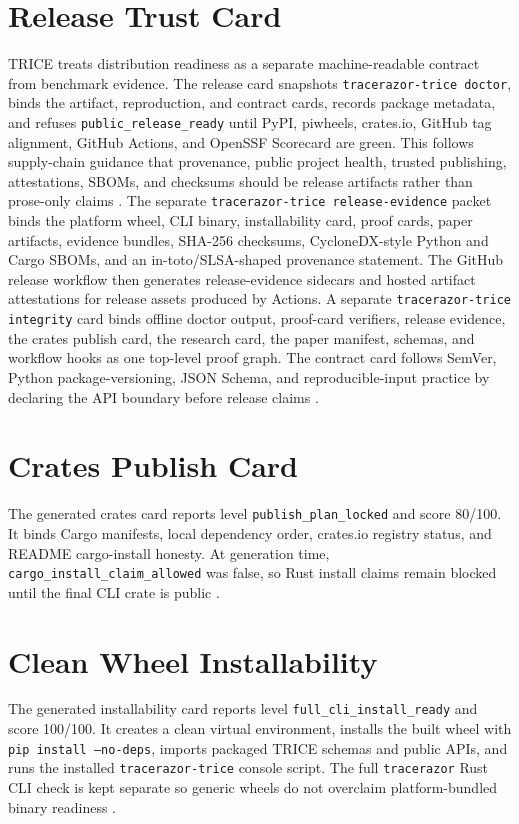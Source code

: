 \documentclass[10pt]{article}
\begin{document}
        \section{Release Trust Card}
TRICE treats distribution readiness as a separate machine-readable contract from benchmark evidence. The release card snapshots \texttt{tracerazor-trice doctor}, binds the artifact, reproduction, and contract cards, records package metadata, and refuses \texttt{public\_release\_ready} until PyPI, piwheels, crates.io, GitHub tag alignment, GitHub Actions, and OpenSSF Scorecard are green. This follows supply-chain guidance that provenance, public project health, trusted publishing, attestations, SBOMs, and checksums should be release artifacts rather than prose-only claims \cite{slsa,openssfscorecard,pypitrust,pypiattest,intoto,cyclonedx}. The separate \texttt{tracerazor-trice release-evidence} packet binds the platform wheel, CLI binary, installability card, proof cards, paper artifacts, evidence bundles, SHA-256 checksums, CycloneDX-style Python and Cargo SBOMs, and an in-toto/SLSA-shaped provenance statement. The GitHub release workflow then generates release-evidence sidecars and hosted artifact attestations for release assets produced by Actions. A separate \texttt{tracerazor-trice integrity} card binds offline doctor output, proof-card verifiers, release evidence, the crates publish card, the research card, the paper manifest, schemas, and workflow hooks as one top-level proof graph. The contract card follows SemVer, Python package-versioning, JSON Schema, and reproducible-input practice by declaring the API boundary before release claims \cite{semver,pyversion,jsonschema2020,reprobuilds}.


        \section{Crates Publish Card}
The generated crates card reports level \texttt{publish\_plan\_locked} and score 80/100. It binds Cargo manifests, local dependency order, crates.io registry status, and README cargo-install honesty. At generation time, \texttt{cargo\_install\_claim\_allowed} was false, so Rust install claims remain blocked until the final CLI crate is public \cite{cargoPublishing}.


        \section{Clean Wheel Installability}
The generated installability card reports level \texttt{full\_cli\_install\_ready} and score 100/100. It creates a clean virtual environment, installs the built wheel with \texttt{pip install --no-deps}, imports packaged TRICE schemas and public APIs, and runs the installed \texttt{tracerazor-trice} console script. The full \texttt{tracerazor} Rust CLI check is kept separate so generic wheels do not overclaim platform-bundled binary readiness \cite{pypapackaging,pipinstall,wheelpep}.
\end{document}
